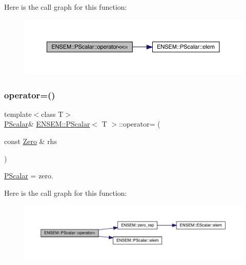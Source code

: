 Here is the call graph for this function\+:
\nopagebreak
\begin{figure}[H]
\begin{center}
\leavevmode
\includegraphics[width=350pt]{d3/d27/classENSEM_1_1PScalar_ade643675ab6ef041676e1098ac740b29_cgraph}
\end{center}
\end{figure}
\mbox{\label{classENSEM_1_1PScalar_a4357d579e24371f6384da9008f4512b3}} 
\subsubsection{\texorpdfstring{operator=()}{operator=()}\hspace{0.1cm}{\footnotesize\ttfamily [1/6]}}
{\footnotesize\ttfamily template$<$class T$>$ \\
\mbox{\hyperlink{classENSEM_1_1PScalar}{P\+Scalar}}\& \mbox{\hyperlink{classENSEM_1_1PScalar}{E\+N\+S\+E\+M\+::\+P\+Scalar}}$<$ T $>$\+::operator= (\begin{DoxyParamCaption}\item[{const \mbox{\hyperlink{structENSEM_1_1Zero}{Zero}} \&}]{rhs }\end{DoxyParamCaption})\hspace{0.3cm}{\ttfamily [inline]}}



\mbox{\hyperlink{classENSEM_1_1PScalar}{P\+Scalar}} = zero. 

Here is the call graph for this function\+:
\nopagebreak
\begin{figure}[H]
\begin{center}
\leavevmode
\includegraphics[width=350pt]{d3/d27/classENSEM_1_1PScalar_a4357d579e24371f6384da9008f4512b3_cgraph}
\end{center}
\end{figure}
\mbox{\label{classENSEM_1_1PScalar_a4357d579e24371f6384da9008f4512b3}} 
